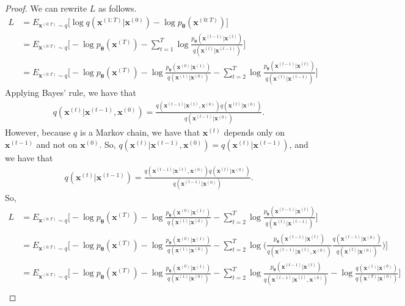 \documentclass[10pt]{article}
\newcommand{\ve}[1]{\mathbf{#1}}
\newcommand{\ves}[1]{\boldsymbol{#1}}
\begin{document}
\begin{itemize}
\begin{proof}
  We can rewrite $L$ as follows.
  \begin{align*}
    L
    &= E_{\ve{x}^{(0:T)} \sim q} \Big[ \log q(\ve{x}^{(1:T)}|\ve{x}^{(0)}) - \log p_{\ves{\theta}}(\ve{x}^{(0:T)}) \Big] \\
    &= E_{\ve{x}^{(0:T)} \sim q} \bigg[ -\log p_{\ves{\theta}}(\ve{x}^{(T)}) - \sum_{t = 1}^T \log \frac{p_{\ves{\theta}}(\ve{x}^{(t-1)}|\ve{x}^{(t)})}{q(\ve{x}^{(t)}|\ve{x}^{(t-1)})} \bigg] \\
    &= E_{\ve{x}^{(0:T)} \sim q} \bigg[ -\log p_{\ves{\theta}}(\ve{x}^{(T)}) - \log \frac{p_{\ves{\theta}}(\ve{x}^{(0)}|\ve{x}^{(1)})}{q(\ve{x}^{(1)}|\ve{x}^{(0)})} - \sum_{t = 2}^T \log \frac{p_{\ves{\theta}}(\ve{x}^{(t-1)}|\ve{x}^{(t)})}{q(\ve{x}^{(t)}|\ve{x}^{(t-1)})} \bigg]
  \end{align*}
  Applying Bayes' rule, we have that
  \begin{align*}
    q(\ve{x}^{(t)}|\ve{x}^{(t-1)},\ve{x}^{(0)}) = \frac{q(\ve{x}^{(t-1)}|\ve{x}^{(t)},\ve{x}^{(0)}) q(\ve{x}^{(t)}|\ve{x}^{(0)})}{q(\ve{x}^{(t-1)}|\ve{x}^{(0)})}.
  \end{align*}
  However, because $q$ is a Markov chain, we have that $\ve{x}^{(t)}$ depends only on $\ve{x}^{(t-1)}$ and not on $\ve{x}^{(0)}$. So, $q(\ve{x}^{(t)}|\ve{x}^{(t-1)},\ve{x}^{(0)}) = q(\ve{x}^{(t)}|\ve{x}^{(t-1)})$, and we have that
  \begin{align*}
    q(\ve{x}^{(t)}|\ve{x}^{(t-1)}) = \frac{q(\ve{x}^{(t-1)}|\ve{x}^{(t)},\ve{x}^{(0)}) q(\ve{x}^{(t)}|\ve{x}^{(0)})}{q(\ve{x}^{(t-1)}|\ve{x}^{(0)})}.
  \end{align*}
  So,
  \begin{align*}
    L
    &= E_{\ve{x}^{(0:T)} \sim q} \bigg[ -\log p_{\ves{\theta}}(\ve{x}^{(T)}) - \log \frac{p_{\ves{\theta}}(\ve{x}^{(0)}|\ve{x}^{(1)})}{q(\ve{x}^{(1)}|\ve{x}^{(0)})} - \sum_{t = 2}^T \log \frac{p_{\ves{\theta}}(\ve{x}^{(t-1)}|\ve{x}^{(t)})}{q(\ve{x}^{(t)}|\ve{x}^{(t-1)})} \bigg] \\
    &= E_{\ve{x}^{(0:T)} \sim q} \bigg[ -\log p_{\ves{\theta}}(\ve{x}^{(T)}) - \log \frac{p_{\ves{\theta}}(\ve{x}^{(0)}|\ve{x}^{(1)})}{q(\ve{x}^{(1)}|\ve{x}^{(0)})} - \sum_{t = 2}^T \log \bigg( \frac{p_{\ves{\theta}}(\ve{x}^{(t-1)}|\ve{x}^{(t)})}{q(\ve{x}^{(t-1)}|\ve{x}^{(t)},\ve{x}^{(0)})} \frac{q(\ve{x}^{(t-1)}|\ve{x}^{(0)})}{q(\ve{x}^{(t)}|\ve{x}^{(0)})} \bigg) \bigg] \\
    &= E_{\ve{x}^{(0:T)} \sim q} \bigg[ -\log p_{\ves{\theta}}(\ve{x}^{(T)}) - \log \frac{p_{\ves{\theta}}(\ve{x}^{(0)}|\ve{x}^{(1)})}{q(\ve{x}^{(1)}|\ve{x}^{(0)})} - \sum_{t = 2}^T \log \frac{p_{\ves{\theta}}(\ve{x}^{(t-1)}|\ve{x}^{(t)})}{q(\ve{x}^{(t-1)}|\ve{x}^{(t)},\ve{x}^{(0)})} - \log \frac{q(\ve{x}^{(1)}|\ve{x}^{(0)})}{q(\ve{x}^{(T)}|\ve{x}^{(0)})} \bigg] \\

\end{align*}
\end{proof}
\end{itemize}
\end{document}

